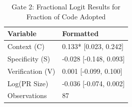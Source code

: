 \begin{table}
\caption{Gate 2: Fractional Logit Results for Fraction of Code Adopted}
\label{tab:gate2}
\begin{tabular}{ll}
\toprule
Variable & Formatted \\
\midrule
Context (C) & 0.133* [0.023, 0.242] \\
Specificity (S) & -0.028 [-0.148, 0.093] \\
Verification (V) & 0.001 [-0.099, 0.100] \\
Log(PR Size) & -0.036 [-0.074, 0.002] \\
Observations & 87 \\
\bottomrule
\end{tabular}
\end{table}
